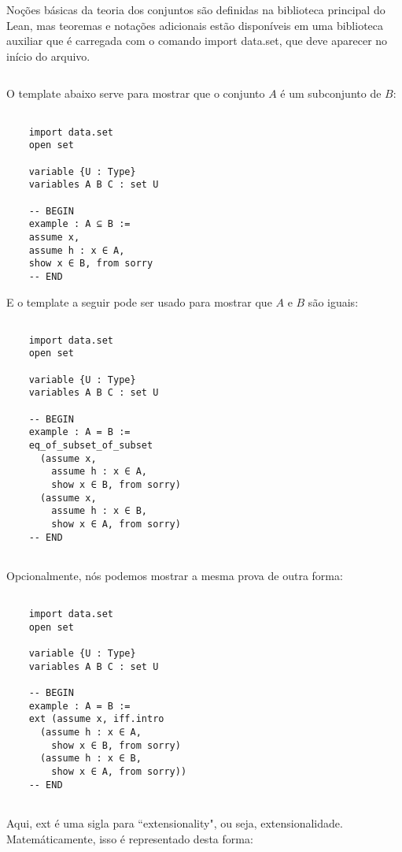 $\qquad$

Noções básicas da teoria dos conjuntos são definidas na biblioteca principal do Lean, mas teoremas e notações adicionais estão disponíveis em uma biblioteca auxiliar que é carregada com o comando 
{
\selectfont import data.set}, que deve aparecer no início do arquivo.

$\qquad$

O template abaixo serve para mostrar que o conjunto $A$ é um subconjunto de $B$:

\begin{lstlisting}

    import data.set
    open set

    variable {U : Type}
    variables A B C : set U

    -- BEGIN
    example : A ⊆ B :=
    assume x,
    assume h : x ∈ A,
    show x ∈ B, from sorry
    -- END

\end{lstlisting}

E o template a seguir pode ser usado para mostrar que $A$ e $B$ são iguais:

\begin{lstlisting}

    import data.set
    open set

    variable {U : Type}
    variables A B C : set U

    -- BEGIN
    example : A = B :=
    eq_of_subset_of_subset
      (assume x,
        assume h : x ∈ A,
        show x ∈ B, from sorry)
      (assume x,
        assume h : x ∈ B,
        show x ∈ A, from sorry)
    -- END
    
\end{lstlisting}

Opcionalmente, nós podemos mostrar a mesma prova de outra forma:

\begin{lstlisting}

    import data.set
    open set

    variable {U : Type}
    variables A B C : set U

    -- BEGIN
    example : A = B :=
    ext (assume x, iff.intro
      (assume h : x ∈ A,
        show x ∈ B, from sorry)
      (assume h : x ∈ B,
        show x ∈ A, from sorry))
    -- END
    
\end{lstlisting}

Aqui, {
\selectfont ext} é uma sigla para ``extensionality", ou seja, extensionalidade. Matemáticamente, isso é representado desta forma:

